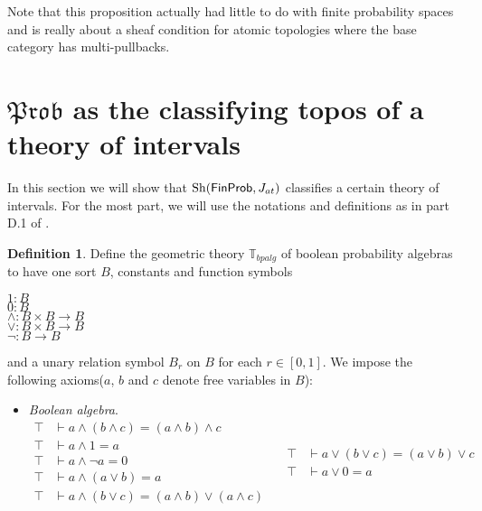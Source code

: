 \documentclass[a4paper]{amsproc}
\theoremstyle{plain}
\theoremstyle{definition}
\newtheorem{definition}[theorem]{Definition}
\theoremstyle{remark}
\numberwithin{equation}{section}
\DeclareMathOperator{\Sh}{Sh}
\newcommand{\FinProb}{\textup{\textsf{FinProb}}}
\newcommand{\Prob}{\mathfrak{Prob}}
\begin{document}
Note that this proposition actually had little to do with finite probability spaces and is really about a sheaf condition for atomic topologies where the base category has multi-pullbacks.


\section{$\Prob$ as the classifying topos of a theory of intervals}

In this section we will show that $\Sh(\FinProb, J_{at})$ classifies a certain theory of intervals. For the most part, we will use the notations and definitions as in part D.1 of \cite{johnstone2002sketches2}.

\begin{definition}
    Define the geometric theory $\mathbb{T}_{bpalg}$ of boolean probability algebras to have one sort $B$, constants and function symbols
    \begin{center}
        $1: B$ \\
        $0: B$ \\
        $\wedge: B \times B \to B$ \\
        $\vee: B \times B \to B$ \\
        $\neg: B \to B$
    \end{center}
    and a unary relation symbol $B_r$ on $B$ for each $r \in [0,1]$. We impose the following axioms($a$, $b$ and $c$ denote free variables in $B$):
    \begin{itemize}
        \item \textit{Boolean algebra}.
        \begin{equation*}
            \begin{split}
                \top &\vdash a \wedge (b \wedge c) = (a \wedge b) \wedge c \\
                \top &\vdash a \wedge 1 = a \\
                \top &\vdash a \wedge \neg{a} = 0 \\
                \top &\vdash a \wedge (a \vee b) = a \\
                \top &\vdash a \wedge (b \vee c) = (a \wedge b) \vee (a \wedge c) \\
            \end{split}
            \quad
            \begin{split}
                \top &\vdash a \vee (b \vee c) = (a \vee b) \vee c \\
                \top &\vdash a \vee 0 = a \\

\end{split}
\end{equation*}
\end{itemize}
\end{definition}
\end{document}
